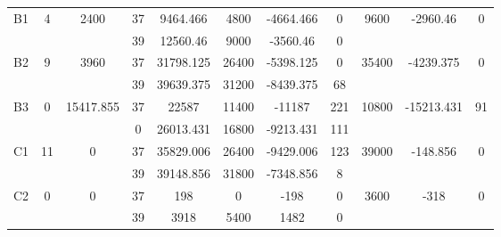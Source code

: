 \begin{sidewaystable}
\begin{tabular}{c||c|c||c|c|c|c|c||c|c|c}
         &
        
      \\
      \hline
      \multirow{2}{*}{B1} &
      \multirow{2}{*}{4} &
      \multirow{2}{*}{2400} &
      37 &
      9464.466 &
      4800 &
        -4664.466 &
        0 &
      \multirow{2}{*}{9600} &
        \multirow{2}{*}{-2960.46} &
        \multirow{2}{*}{0}
      \\
      \cline{4-8}
       &
       &
       &
      39 &
      12560.46 &
      9000 &
        -3560.46 &
        0 &
      
         &
        
      \\
      \hline
      \multirow{2}{*}{B2} &
      \multirow{2}{*}{9} &
      \multirow{2}{*}{3960} &
      37 &
      31798.125 &
      26400 &
        -5398.125 &
        0 &
      \multirow{2}{*}{35400} &
        \multirow{2}{*}{-4239.375} &
        \multirow{2}{*}{0}
      \\
      \cline{4-8}
       &
       &
       &
      39 &
      39639.375 &
      31200 &
        -8439.375 &
        68 &
      
         &
        
      \\
      \hline
      \multirow{2}{*}{B3} &
      \multirow{2}{*}{0} &
      \multirow{2}{*}{15417.855} &
      37 &
      22587 &
      11400 &
        -11187 &
        221 &
      \multirow{2}{*}{10800} &
        \multirow{2}{*}{-15213.431} &
        \multirow{2}{*}{91}
      \\
      \cline{4-8}
       &
       &
       &
      0 &
      26013.431 &
      16800 &
        -9213.431 &
        111 &
      
         &
        
      \\
      \hline
      \multirow{2}{*}{C1} &
      \multirow{2}{*}{11} &
      \multirow{2}{*}{0} &
      37 &
      35829.006 &
      26400 &
        -9429.006 &
        123 &
      \multirow{2}{*}{39000} &
        \multirow{2}{*}{-148.856} &
        \multirow{2}{*}{0}
      \\
      \cline{4-8}
       &
       &
       &
      39 &
      39148.856 &
      31800 &
        -7348.856 &
        8 &
      
         &
        
      \\
      \hline
      \multirow{2}{*}{C2} &
      \multirow{2}{*}{0} &
      \multirow{2}{*}{0} &
      37 &
      198 &
      0 &
        -198 &
        0 &
      \multirow{2}{*}{3600} &
        \multirow{2}{*}{-318} &
        \multirow{2}{*}{0}
      \\
      \cline{4-8}
       &
       &
       &
      39 &
      3918 &
      5400 &
        1482 &
        0 &
      

\end{tabular}
\end{sidewaystable}
